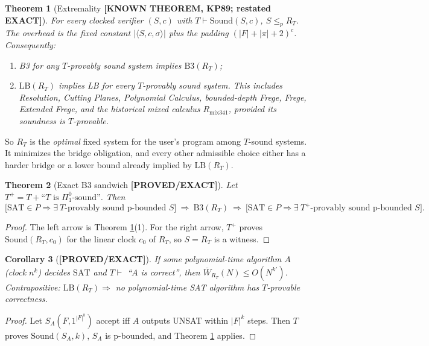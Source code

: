 \documentclass[11pt]{article}
\newtheorem{theorem}{Theorem}
\newtheorem{corollary}[theorem]{Corollary}
\theoremstyle{definition}
\theoremstyle{remark}
\newcommand{\SAT}{\mathrm{SAT}}
\newcommand{\Wb}{\overline W}
\newcommand{\Sound}{\mathrm{Sound}}
\newcommand{\status}[1]{\textbf{[#1]}}
\begin{document}
\begin{theorem}[Extremality \status{KNOWN THEOREM, KP89; restated EXACT}]\label{thm:ext}
For every clocked verifier $(S,c)$ with $T\vdash\Sound(S,c)$, $S\le_p R_T$. The overhead is
the fixed constant $|\langle S,c,\sigma\rangle|$ plus the padding $(|F|+|\pi|+2)^c$. Consequently:
\begin{enumerate}
\item B3 for any $T$-provably sound system implies $\mathrm{B3}(R_T)$;
\item $\mathrm{LB}(R_T)$ implies LB for every $T$-provably sound system. This includes Resolution,
Cutting Planes, Polynomial Calculus, bounded-depth Frege, Frege, Extended Frege, and the
historical mixed calculus $R_{\mathrm{mix341}}$, provided its soundness is $T$-provable.
\end{enumerate}
\end{theorem}

So $R_T$ is the \emph{optimal} fixed system for the user's program among $T$-sound systems. It
minimizes the bridge obligation, and every other admissible choice either has a harder bridge or a
lower bound already implied by $\mathrm{LB}(R_T)$.

\begin{theorem}[Exact B3 sandwich \status{PROVED/EXACT}]\label{thm:sand}
Let $T^{+}=T+\text{``}T\text{ is }\Pi^0_1\text{-sound''}$. Then
\[
\bigl[\SAT\in P\Rightarrow\exists\ T\text{-provably sound p-bounded }S\bigr]
\ \Longrightarrow\ \mathrm{B3}(R_T)\ \Longrightarrow\
\bigl[\SAT\in P\Rightarrow\exists\ T^{+}\text{-provably sound p-bounded }S\bigr].
\]
\end{theorem}
\begin{proof}
The left arrow is Theorem \ref{thm:ext}(1). For the right arrow, $T^{+}$ proves
$\Sound(R_T,c_0)$ for the linear clock $c_0$ of $R_T$, so $S=R_T$ is a witness.
\end{proof}

\begin{corollary}[\status{PROVED/EXACT}]\label{cor:alg}
If some polynomial-time algorithm $A$ (clock $n^k$) decides $\SAT$ and $T\vdash$ ``$A$ is correct'',
then $\Wb_{R_T}(N)\le O(N^{k'})$. Contrapositive:
$\mathrm{LB}(R_T)\Rightarrow$ no polynomial-time SAT algorithm has $T$-provable correctness.
\end{corollary}
\begin{proof}
Let $S_A(F,1^{|F|^k})$ accept iff $A$ outputs UNSAT within $|F|^k$ steps. Then $T$ proves
$\Sound(S_A,k)$, $S_A$ is p-bounded, and Theorem \ref{thm:ext} applies.
\end{proof}
\end{document}

